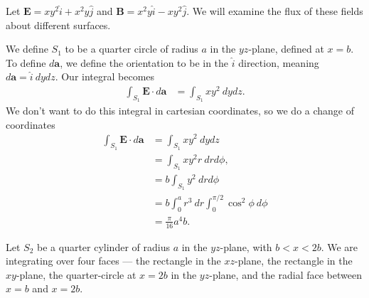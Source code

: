 \documentclass[10pt]{mypackage}
\begin{document}
\begin{example}
  Let $\mathbf{E} = xy^2\widehat{i} + x^2y\widehat{j}$ and $\mathbf{B} = x^2y\widehat{i} - xy^2\widehat{j}$. We will examine the flux of these fields about different surfaces.
  \begin{example}
    We define $S_1$ to be a quarter circle of radius $a$ in the $yz$-plane, defined at $x=b$. To define $d\mathbf{a}$, we define the orientation to be in the $\widehat{i}$ direction, meaning $d\mathbf{a} = \widehat{i}\:dydz$. Our integral becomes
    \begin{align*}
      \int_{S_1}^{} \mathbf{E}\cdot d\mathbf{a} &= \int_{S_1}^{} xy^2\:dydz.
    \end{align*}
    We don't want to do this integral in cartesian coordinates, so we do a change of coordinates
    \begin{align*}
      \int_{S_1}^{} \mathbf{E}\cdot d\mathbf{a} &= \int_{S_1}^{} xy^2\:dydz\\
                                                &= \int_{S_1}^{} xy^2 r\:dr d\phi,\\
                                                &= b\int_{S_1}^{} y^2\:dr d\phi\\
                                                &= b\int_{0}^{a}r^3\:dr\int_{0}^{\pi/2}\cos^2\phi\:d\phi\\
                                                &=\frac{\pi}{16}a^4b.
    \end{align*}
  \end{example}
  \begin{example}
    Let $S_2$ be a quarter cylinder of radius $a$ in the $yz$-plane, with $b < x < 2b$. We are integrating over four faces --- the rectangle in the $xz$-plane, the rectangle in the $xy$-plane, the quarter-circle at $x = 2b$ in the $yz$-plane, and the radial face between $x=b$ and $x=2b$.\newline


\end{example}
\end{example}
\end{document}
